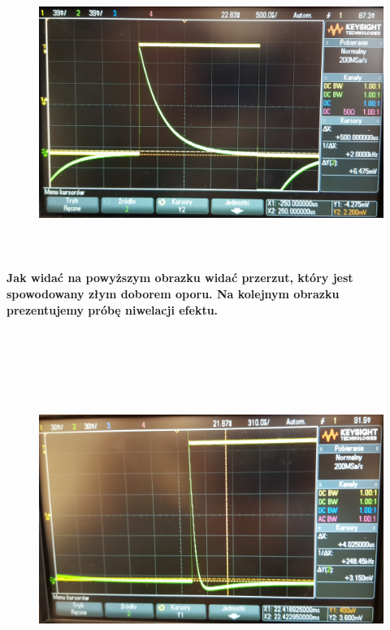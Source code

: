 \documentclass[a4paper,12pt]{article}
\begin{document}
\begin{justify}
\newpage

\begin{figure}[h]
\centering
\includegraphics[width=15cm, height=9cm]{przerzut}
\end{figure}

\paragraph{Jak widać na powyższym obrazku widać przerzut, który jest spowodowany złym doborem oporu. Na kolejnym obrazku prezentujemy próbę niwelacji efektu.}

\paragraph{\\ \, \\}

\begin{figure}[h]
\centering
\includegraphics[width=15cm, height=9cm]{bez_przerzutu}
\end{figure}


\end{justify}
\end{document}
